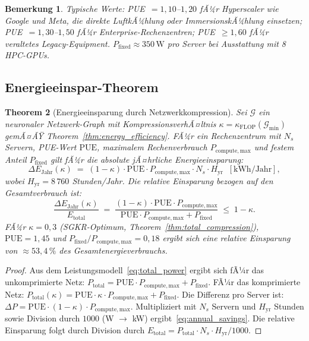 ﻿\documentclass[12pt, a4paper, openany]{report}
\newtheorem{theorem}{Theorem}[chapter]
\newtheorem{remark}[theorem]{Bemerkung}
\newcommand{\calG}{\mathcal{G}}
\begin{document}
\begin{remark}
Typische Werte: PUE~$= 1{,}10$--$1{,}20$ fÃ¼r Hyperscaler wie Google und
Meta, die direkte LuftkÃ¼hlung oder ImmersionskÃ¼hlung einsetzen;
PUE~$= 1{,}30$--$1{,}50$ fÃ¼r Enterprise-Rechenzentren;
PUE~$\geq 1{,}60$ fÃ¼r veraltetes Legacy-Equipment.
$P_{\mathrm{fixed}} \approx 350\,\mathrm{W}$ pro Server bei Ausstattung
mit 8 HPC-GPUs.
\end{remark}

\subsection{Energieeinspar-Theorem}

\begin{theorem}[Energieeinsparung durch Netzwerkkompression]
\label{thm:energy_savings}
Sei $\calG$ ein neuronaler Netzwerk-Graph mit KompressionsverhÃ¤ltnis
$\kappa = \kappa_{\mathrm{FLOP}}(\calG_{\min})$ gemÃ¤ÃŸ
Theorem~\ref{thm:energy_efficiency}.  FÃ¼r ein Rechenzentrum mit
$N_s$ Servern, PUE-Wert $\mathrm{PUE}$, maximalem Rechenverbrauch
$P_{\mathrm{compute,max}}$ und festem Anteil $P_{\mathrm{fixed}}$ gilt fÃ¼r
die absolute jÃ¤hrliche Energieeinsparung:
\begin{equation}
  \label{eq:annual_savings}
  \Delta E_{\mathrm{Jahr}}(\kappa)
  \;=\;
  (1 - \kappa) \cdot \mathrm{PUE} \cdot P_{\mathrm{compute,max}} \cdot N_s \cdot H_{\mathrm{yr}}
  \;\;[\mathrm{kWh/Jahr}],
\end{equation}
wobei $H_{\mathrm{yr}} = 8\,760$ Stunden/Jahr.  Die \emph{relative Einsparung}
bezogen auf den Gesamtverbrauch ist:
\begin{equation}
  \label{eq:relative_savings}
  \frac{\Delta E_{\mathrm{Jahr}}(\kappa)}{E_{\mathrm{total}}}
  \;=\;
  \frac{(1-\kappa)\cdot\mathrm{PUE}\cdot P_{\mathrm{compute,max}}}
       {\mathrm{PUE}\cdot P_{\mathrm{compute,max}} + P_{\mathrm{fixed}}}
  \;\leq\; 1 - \kappa.
\end{equation}
FÃ¼r $\kappa = 0{,}3$ (SGKR-Optimum, Theorem~\ref{thm:total_compression}),
$\mathrm{PUE} = 1{,}45$ und $P_{\mathrm{fixed}}/P_{\mathrm{compute,max}} = 0{,}18$
ergibt sich eine relative Einsparung von
$\approx 53{,}4\,\%$ des Gesamtenergieverbrauchs.
\end{theorem}

\begin{proof}
Aus dem Leistungsmodell~\eqref{eq:total_power} ergibt sich fÃ¼r das
unkomprimierte Netz:
$P_{\mathrm{total}} = \mathrm{PUE} \cdot P_{\mathrm{compute,max}} + P_{\mathrm{fixed}}$.
FÃ¼r das komprimierte Netz:
$P_{\mathrm{total}}(\kappa) = \mathrm{PUE} \cdot \kappa \cdot P_{\mathrm{compute,max}} + P_{\mathrm{fixed}}$.
Die Differenz pro Server ist:
$\Delta P = \mathrm{PUE} \cdot (1-\kappa) \cdot P_{\mathrm{compute,max}}$.
Multipliziert mit $N_s$ Servern und $H_{\mathrm{yr}}$ Stunden sowie
Division durch $1000$ (W $\to$ kW) ergibt~\eqref{eq:annual_savings}.
Die relative Einsparung folgt durch Division durch
$E_{\mathrm{total}} = P_{\mathrm{total}} \cdot N_s \cdot H_{\mathrm{yr}} / 1000$.
\end{proof}
\end{document}
